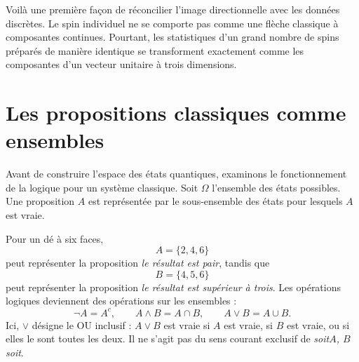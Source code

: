 \begin{classroomqa}
\end{classroomqa}

\begin{classroomqa}
\end{classroomqa}

Voilà une première façon de réconcilier l’image directionnelle avec les données discrètes. Le spin individuel ne se comporte pas comme une flèche classique à composantes continues. Pourtant, les statistiques d’un grand nombre de spins préparés de manière identique se transforment exactement comme les composantes d’un vecteur unitaire à trois dimensions.

\section{Les propositions classiques comme ensembles}

Avant de construire l’espace des états quantiques, examinons le fonctionnement de la logique pour un système classique. Soit \(\Omega\) l’ensemble des états possibles. Une proposition \(A\) est représentée par le sous-ensemble des états pour lesquels \(A\) est vraie.

Pour un dé à six faces,
\[
A=\{2,4,6\}
\]
peut représenter la proposition \emph{le résultat est pair}, tandis que
\[
B=\{4,5,6\}
\]
peut représenter la proposition \emph{le résultat est supérieur à trois}. Les opérations logiques deviennent des opérations sur les ensembles :
\begin{equation}
\neg A=A^c,\qquad
A\land B=A\cap B,\qquad
A\lor B=A\cup B.
\label{eq:classical-logic}
\end{equation}
Ici, \(\lor\) désigne le OU inclusif : \(A\lor B\) est vraie si \(A\) est vraie, si \(B\) est vraie, ou si elles le sont toutes les deux. Il ne s’agit pas du sens courant exclusif de \emph{soit\(A\), \(B\)soit}.

